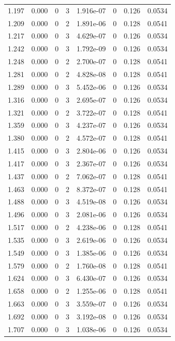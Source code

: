 \documentclass[preview]{standalone}
\begin{document}
{{{\begin{tabular}{L{1.2cm}C{1.2cm} C{0.3cm}C{0.5cm} C{1.4cm}C{1.4cm} C{1.4cm}C{1.4cm}}
  1.197  &  0.000  & 0     &  3 &  1.916e-07  & 0  & 0.126 &  0.0534   \\ 
  1.209  &  0.000  & 0     &  2 &  1.891e-06  & 0  & 0.128 &  0.0541   \\ 
  1.217  &  0.000  & 0     &  3 &  4.629e-07  & 0  & 0.126 &  0.0534   \\ 
  1.242  &  0.000  & 0     &  3 &  1.792e-09  & 0  & 0.126 &  0.0534   \\ 
  1.248  &  0.000  & 0     &  2 &  2.700e-07  & 0  & 0.128 &  0.0541   \\ 
  1.281  &  0.000  & 0     &  2 &  4.828e-08  & 0  & 0.128 &  0.0541   \\ 
  1.289  &  0.000  & 0     &  3 &  5.452e-06  & 0  & 0.126 &  0.0534   \\ 
  1.316  &  0.000  & 0     &  3 &  2.695e-07  & 0  & 0.126 &  0.0534   \\ 
  1.321  &  0.000  & 0     &  2 &  3.722e-07  & 0  & 0.128 &  0.0541   \\ 
  1.359  &  0.000  & 0     &  3 &  4.237e-07  & 0  & 0.126 &  0.0534   \\ 
  1.380  &  0.000  & 0     &  2 &  4.572e-07  & 0  & 0.128 &  0.0541   \\ 
  1.415  &  0.000  & 0     &  3 &  2.804e-06  & 0  & 0.126 &  0.0534   \\ 
  1.417  &  0.000  & 0     &  3 &  2.367e-07  & 0  & 0.126 &  0.0534   \\ 
  1.437  &  0.000  & 0     &  2 &  7.062e-07  & 0  & 0.128 &  0.0541   \\ 
  1.463  &  0.000  & 0     &  2 &  8.372e-07  & 0  & 0.128 &  0.0541   \\ 
  1.488  &  0.000  & 0     &  3 &  4.519e-08  & 0  & 0.126 &  0.0534   \\ 
  1.496  &  0.000  & 0     &  3 &  2.081e-06  & 0  & 0.126 &  0.0534   \\ 
  1.517  &  0.000  & 0     &  2 &  4.238e-06  & 0  & 0.128 &  0.0541   \\ 
  1.535  &  0.000  & 0     &  3 &  2.619e-06  & 0  & 0.126 &  0.0534   \\ 
  1.549  &  0.000  & 0     &  3 &  1.385e-06  & 0  & 0.126 &  0.0534   \\ 
  1.579  &  0.000  & 0     &  2 &  1.760e-08  & 0  & 0.128 &  0.0541   \\ 
  1.624  &  0.000  & 0     &  3 &  6.430e-07  & 0  & 0.126 &  0.0534   \\ 
  1.658  &  0.000  & 0     &  2 &  1.255e-06  & 0  & 0.128 &  0.0541   \\ 
  1.663  &  0.000  & 0     &  3 &  3.559e-07  & 0  & 0.126 &  0.0534   \\ 
  1.692  &  0.000  & 0     &  3 &  3.192e-08  & 0  & 0.126 &  0.0534   \\ 
  1.707  &  0.000  & 0     &  3 &  1.038e-06  & 0  & 0.126 &  0.0534   \\ 
\hline 
\end{tabular} 

}}}
\end{document}
